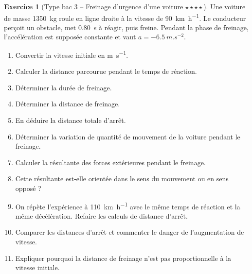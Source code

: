 \documentclass[11pt,a4paper]{article}
\theoremstyle{definition}
\newtheorem{exercice}{Exercice}[section]
\newcommand{\etoiles}[1]{\hfill{\small\textbf{#1}}}
\begin{document}
\begin{exercice}[Type bac 3 -- Freinage d’urgence d’une voiture \etoiles{$\star\star\star\star$}]
Une voiture de masse \SI{1350}{kg} roule en ligne droite à la vitesse de \SI{90}{km.h^{-1}}.
Le conducteur perçoit un obstacle, met \SI{0,80}{s} à réagir, puis freine.
Pendant la phase de freinage, l’accélération est supposée constante et vaut
$a=\SI{-6,5}{m.s^{-2}}$.

\begin{enumerate}[label=\arabic*.]
    \item Convertir la vitesse initiale en \si{m.s^{-1}}.
    \item Calculer la distance parcourue pendant le temps de réaction.
    \item Déterminer la durée de freinage.
    \item Déterminer la distance de freinage.
    \item En déduire la distance totale d’arrêt.
    \item Déterminer la variation de quantité de mouvement de la voiture pendant le freinage.
    \item Calculer la résultante des forces extérieures pendant le freinage.
    \item Cette résultante est-elle orientée dans le sens du mouvement ou en sens opposé ?
    \item On répète l’expérience à \SI{110}{km.h^{-1}} avec le même temps de réaction et la même
    décélération. Refaire les calculs de distance d’arrêt.
    \item Comparer les distances d’arrêt et commenter le danger de l’augmentation de vitesse.
    \item Expliquer pourquoi la distance de freinage n’est pas proportionnelle à la vitesse initiale.
\end{enumerate}
\end{exercice}
\end{document}
